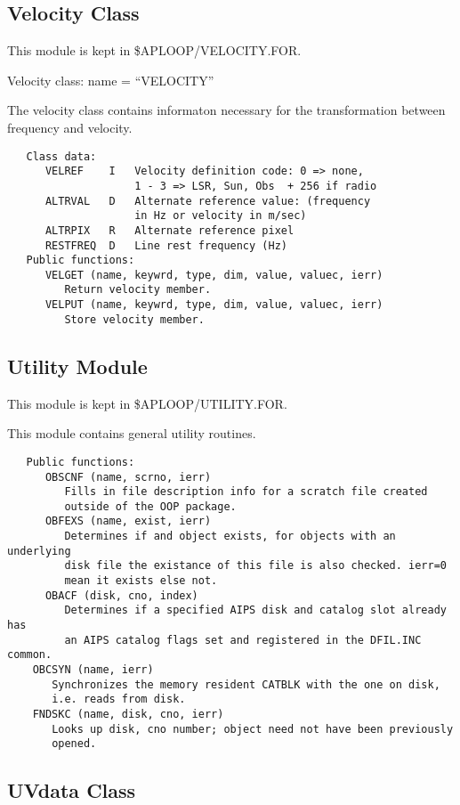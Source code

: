 \subsection{Velocity Class}

   This module is kept in \$APLOOP/VELOCITY.FOR.

   Velocity class: name = ``VELOCITY''

   The velocity class contains informaton necessary for the
transformation between frequency and velocity.
{\small\begin{verbatim}
   Class data:
      VELREF    I   Velocity definition code: 0 => none,
                    1 - 3 => LSR, Sun, Obs  + 256 if radio
      ALTRVAL   D   Alternate reference value: (frequency
                    in Hz or velocity in m/sec)
      ALTRPIX   R   Alternate reference pixel
      RESTFREQ  D   Line rest frequency (Hz)
   Public functions:
      VELGET (name, keywrd, type, dim, value, valuec, ierr)
         Return velocity member.
      VELPUT (name, keywrd, type, dim, value, valuec, ierr)
         Store velocity member.
\end{verbatim}}
\subsection{Utility Module}

   This module is kept in \$APLOOP/UTILITY.FOR.

   This module contains general utility routines.

{\small\begin{verbatim}
   Public functions:
      OBSCNF (name, scrno, ierr)
         Fills in file description info for a scratch file created
         outside of the OOP package.
      OBFEXS (name, exist, ierr)
         Determines if and object exists, for objects with an underlying
         disk file the existance of this file is also checked. ierr=0
         mean it exists else not.
      OBACF (disk, cno, index)
         Determines if a specified AIPS disk and catalog slot already has
         an AIPS catalog flags set and registered in the DFIL.INC common.
    OBCSYN (name, ierr)
       Synchronizes the memory resident CATBLK with the one on disk,
       i.e. reads from disk.
    FNDSKC (name, disk, cno, ierr)
       Looks up disk, cno number; object need not have been previously
       opened.

\end{verbatim}}
\subsection{UVdata Class}

